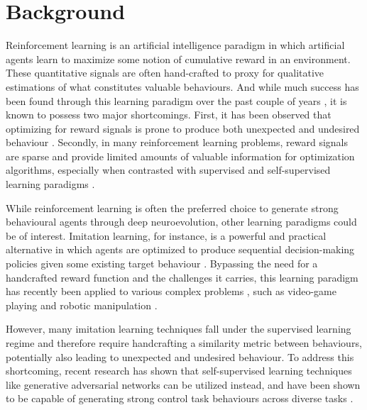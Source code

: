 \documentclass[dvipsnames,format=sigconf,anonymous=false,review=false]{acmart}
\begin{document}
\vspace{-1em}

\section{Background}

Reinforcement learning \cite{sutton2018reinforcement} is an artificial intelligence paradigm in which artificial agents learn to maximize some notion of cumulative reward in an environment. These quantitative signals are often hand-crafted to proxy for qualitative estimations of what constitutes valuable behaviours. And while much success has been found through this learning paradigm over the past couple of years \cite{mnih2013playing,berner2019dota,vinyals2019grandmaster}, it is known to possess two major shortcomings. First, it has been observed that optimizing for reward signals is prone to produce both unexpected and undesired behaviour \cite{clark2016faulty}. Secondly, in many reinforcement learning problems, reward signals are sparse and provide limited amounts of valuable information for optimization algorithms, especially when contrasted with supervised and self-supervised learning paradigms \cite{lecun2016predictive}.

While reinforcement learning is often the preferred choice to generate strong behavioural agents through deep neuroevolution, other learning paradigms could be of interest. Imitation learning, for instance, is a powerful and practical alternative in which agents are optimized to produce sequential decision-making policies given some existing target behaviour \cite{hussein2017imitation}. Bypassing the need for a handcrafted reward function and the challenges it carries, this learning paradigm has recently been applied to various complex problems \cite{torabi2019recent}, such as video-game playing \cite{baker2022video} and robotic manipulation \cite{brohan2022rt}.  

However, many imitation learning techniques fall under the supervised learning regime and therefore require handcrafting a similarity metric between behaviours, potentially also leading to unexpected and undesired behaviour. To address this shortcoming, recent research has shown that self-supervised learning techniques like generative adversarial networks can be utilized instead, and have been shown to be capable of generating strong control task behaviours across diverse tasks \cite{ho2016generative}. 
\end{document}
